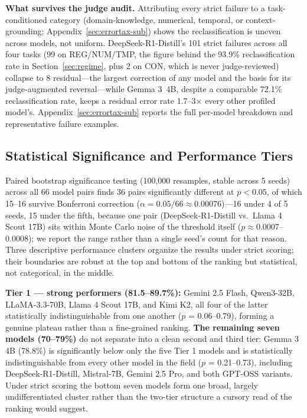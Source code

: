 \textbf{What survives the judge audit.} Attributing every strict failure to a task-conditioned
category (domain-knowledge, numerical, temporal, or context-grounding; Appendix~\ref{sec:errortax-sub})
shows the reclassification is uneven across models, not uniform. DeepSeek-R1-Distill's 101 strict
failures across all four tasks (99 on REG/NUM/TMP, the figure behind the 93.9\% reclassification rate
in Section~\ref{sec:regime}, plus 2 on CON, which is never judge-reviewed) collapse to 8 residual---the
largest correction of any model and the basis for its judge-augmented reversal---while Gemma 3~4B,
despite a comparable 72.1\% reclassification rate,
keeps a residual error rate 1.7--3$\times$ every other profiled model's. Appendix~\ref{sec:errortax-sub}
reports the full per-model breakdown
and representative failure examples.

\subsection{Statistical Significance and Performance Tiers}
\label{sec:significance}

Paired bootstrap significance testing (100,000 resamples, stable across 5 seeds) across all 66
model pairs finds 36 pairs significantly different at $p < 0.05$, of which 15--16 survive Bonferroni
correction ($\alpha = 0.05/66 \approx 0.00076$)---16 under 4 of 5 seeds, 15 under the fifth, because
one pair (DeepSeek-R1-Distill vs.\ Llama 4 Scout 17B) sits within Monte Carlo noise of the threshold
itself ($p \approx 0.0007$--$0.0008$); we report the range rather than a single seed's count for
that reason. Three descriptive performance clusters
organize the results under strict scoring; their boundaries are robust at the top and bottom of the
ranking but statistical, not categorical, in the middle.

\textbf{Tier 1 --- strong performers (81.5--89.7\%):} Gemini 2.5 Flash, Qwen3-32B, LLaMA-3.3-70B,
Llama 4 Scout 17B, and Kimi K2, all four of the latter statistically indistinguishable from one
another ($p$ = 0.06--0.79), forming a genuine plateau rather than a fine-grained ranking.
\textbf{The remaining seven models (70--79\%)} do not separate into a clean second and third tier:
Gemma 3 4B (78.8\%) is significantly below only the five Tier 1 models and is statistically
indistinguishable from every other model in the field ($p$ = 0.21--0.73), including
DeepSeek-R1-Distill, Mistral-7B, Gemini 2.5 Pro, and both GPT-OSS variants. Under strict scoring the
bottom seven models form one broad, largely undifferentiated cluster rather than the two-tier
structure a cursory read of the ranking would suggest.

